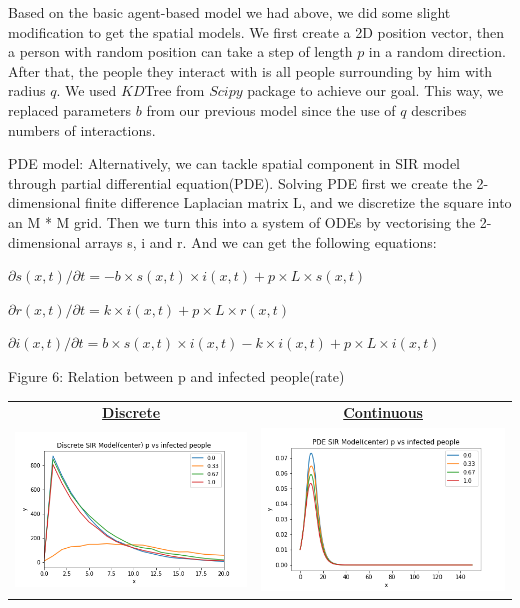 \documentclass[11pt,a4paper]{article}
\begin{document}
\medskip \noindent
Based on the basic agent-based model we had above, we did some slight modification to get the spatial models. We first create a 2D position vector, then a person with random position can take a step of length $p$ in a random direction. After that, the people they interact with is all people surrounding by him with radius $q$. We used $KD$Tree from $Scipy$ package to achieve our goal. This way, we replaced parameters $b$ from our previous model since the use of $q$ describes numbers of interactions. 

\medskip \noindent \newline
PDE model: 
Alternatively, we can tackle spatial component in SIR model through partial differential equation(PDE). Solving PDE first we create the 2-dimensional finite difference Laplacian matrix L, and we discretize the square into an M * M grid. Then we turn this into a system of ODEs by vectorising the 2-dimensional arrays s, i and r. And we can get the following equations:

$\partial s(x, t)/ \partial t = -b \times s(x, t) \times i(x, t) + p \times L \times s(x, t)$

$\partial r(x, t)/ \partial t = k \times i(x, t) + p \times L \times r(x, t)$

$\partial i(x, t)/ \partial t = b \times s(x, t) \times i(x, t) - k \times i(x, t) + p \times L \times i(x, t)$

  \begin{center}
 	Figure 6: Relation between p and infected people(rate)
 \end{center}
 \begin{center}
 	
 	\begin{tabular}{c c}
 		\textbf{\underline{Discrete}} &
 		\textbf{\underline{Continuous}} \\
 		\includegraphics[width=.5\textwidth]{Discrte_spatial(center)_p.png} & \includegraphics[width=.5\textwidth]{PDE(center)_p.png}
 	\end{tabular}
 
 \end{center}
 
\end{document}
